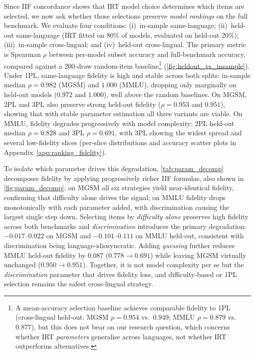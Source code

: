 \documentclass[11pt]{article}
\begin{document}
Since IIF concordance shows that IRT model choice determines which items are selected,
we now ask whether those selections preserve \emph{model rankings} on the full
benchmark. We evaluate four conditions: (i)~in-sample same-language; (ii)~held-out
same-language (IRT fitted on 80\% of models, evaluated on held-out 20\%);
(iii)~in-sample cross-lingual; and (iv)~held-out cross-lingual. The primary metric is
Spearman $\rho$ between per-model subset accuracy and full-benchmark accuracy,
compared against a 200-draw random-item baseline\footnote{A mean-accuracy selection baseline achieves comparable fidelity to 1PL (cross-lingual held-out: MGSM $\rho = 0.954$ vs.\ $0.949$; MMLU $\rho = 0.879$ vs.\ $0.877$), but this does not bear on our research question, which concerns whether IRT \textit{parameters} generalise across languages, not whether IRT outperforms alternatives.} (\autoref{fig:heldout_vs_insample}). Under 1PL, same-language fidelity is high and stable across both splits: in-sample median $\rho = 0.982$ (MGSM) and $1.000$ (MMLU), dropping only marginally on held-out models ($0.972$ and $1.000$), well above the random baselines. On MGSM, 2PL and 3PL also preserve strong held-out fidelity ($\rho = 0.953$ and $0.951$), showing that with stable parameter estimation all three variants are viable. On MMLU, fidelity degrades progressively with model complexity: 2PL held-out median $\rho = 0.828$ and 3PL $\rho = 0.691$, with 3PL showing the widest spread and several low-fidelity slices (per-slice distributions and accuracy scatter plots in Appendix~\ref{app:ranking_fidelity}).

To isolate which parameter drives this degradation, \autoref{tab:param_decomp}
decomposes fidelity by applying progressively richer IIF formulas, also shown in \autoref{fig:param_decomp}: on MGSM all six strategies yield near-identical fidelity, confirming that difficulty alone drives the signal; on MMLU fidelity drops monotonically with each parameter added, with discrimination causing the largest single step down. Selecting items by \textit{difficulty alone} preserves high fidelity across both benchmarks and \textit{discrimination} introduces the primary degradation: $-0.017$--$0.022$ on MGSM and $-0.101$--$0.111$ on MMLU held-out, consistent with discrimination being language-idiosyncratic. Adding \textit{guessing} further reduces MMLU held-out fidelity by $0.087$ ($0.778 \to 0.691$) while leaving MGSM virtually unchanged ($0.950 \to 0.951$). Together, it is not model complexity per se but the \textit{discrimination} parameter that drives fidelity loss, and difficulty-based or 1PL selection remains the safest cross-lingual strategy.
\end{document}
